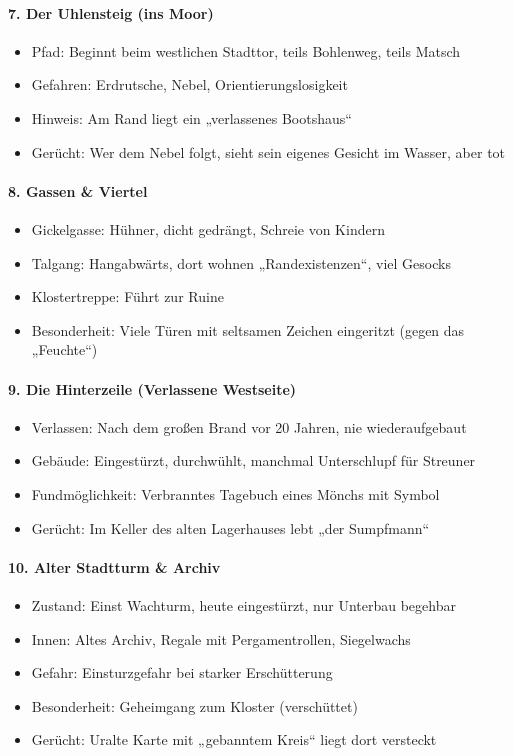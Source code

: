 \paragraph{7. Der Uhlensteig (ins Moor)}
\begin{itemize}
\item Pfad: Beginnt beim westlichen Stadttor, teils Bohlenweg, teils Matsch
\item Gefahren: Erdrutsche, Nebel, Orientierungslosigkeit
\item Hinweis: Am Rand liegt ein „verlassenes Bootshaus“
\item Gerücht: Wer dem Nebel folgt, sieht sein eigenes Gesicht im Wasser, aber tot
\end{itemize}

\paragraph{8. Gassen \& Viertel}
\begin{itemize}
\item Gickelgasse: Hühner, dicht gedrängt, Schreie von Kindern
\item Talgang: Hangabwärts, dort wohnen „Randexistenzen“, viel Gesocks
\item Klostertreppe: Führt zur Ruine
\item Besonderheit: Viele Türen mit seltsamen Zeichen eingeritzt (gegen das „Feuchte“)
\end{itemize}

\paragraph{9. Die Hinterzeile (Verlassene Westseite)}
\begin{itemize}
\item Verlassen: Nach dem großen Brand vor 20 Jahren, nie wiederaufgebaut
\item Gebäude: Eingestürzt, durchwühlt, manchmal Unterschlupf für Streuner
\item Fundmöglichkeit: Verbranntes Tagebuch eines Mönchs mit Symbol
\item Gerücht: Im Keller des alten Lagerhauses lebt „der Sumpfmann“
\end{itemize}

\paragraph{10. Alter Stadtturm \& Archiv}
\begin{itemize}
\item Zustand: Einst Wachturm, heute eingestürzt, nur Unterbau begehbar
\item Innen: Altes Archiv, Regale mit Pergamentrollen, Siegelwachs
\item Gefahr: Einsturzgefahr bei starker Erschütterung
\item Besonderheit: Geheimgang zum Kloster (verschüttet)
\item Gerücht: Uralte Karte mit „gebanntem Kreis“ liegt dort versteckt
\end{itemize}
\newpage
